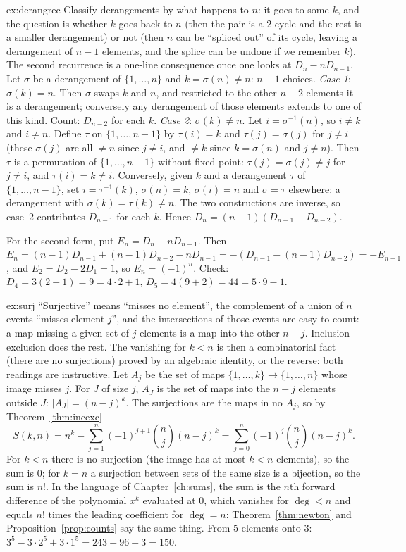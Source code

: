 \begin{solution}{ex:derangrec}
\idea Classify derangements by what happens to $n$: it goes to some $k$, and the question is whether $k$ goes back to $n$ (then the pair is a $2$-cycle and the rest is a smaller derangement) or not (then $n$ can be ``spliced out'' of its cycle, leaving a derangement of $n-1$ elements, and the splice can be undone if we remember $k$). The second recurrence is a one-line consequence once one looks at $D_n-nD_{n-1}$.
\writeup Let $\sigma$ be a derangement of $\{1,\dots,n\}$ and $k=\sigma(n)\ne n$: $n-1$ choices. \emph{Case 1}: $\sigma(k)=n$. Then $\sigma$ swaps $k$ and $n$, and restricted to the other $n-2$ elements it is a derangement; conversely any derangement of those elements extends to one of this kind. Count: $D_{n-2}$ for each $k$. \emph{Case 2}: $\sigma(k)\ne n$. Let $i=\sigma^{-1}(n)$, so $i\ne k$ and $i\ne n$. Define $\tau$ on $\{1,\dots,n-1\}$ by $\tau(i)=k$ and $\tau(j)=\sigma(j)$ for $j\ne i$ (these $\sigma(j)$ are all $\ne n$ since $j\ne i$, and $\ne k$ since $k=\sigma(n)$ and $j\ne n$). Then $\tau$ is a permutation of $\{1,\dots,n-1\}$ without fixed point: $\tau(j)=\sigma(j)\ne j$ for $j\ne i$, and $\tau(i)=k\ne i$. Conversely, given $k$ and a derangement $\tau$ of $\{1,\dots,n-1\}$, set $i=\tau^{-1}(k)$, $\sigma(n)=k$, $\sigma(i)=n$ and $\sigma=\tau$ elsewhere: a derangement with $\sigma(k)=\tau(k)\ne n$. The two constructions are inverse, so case~2 contributes $D_{n-1}$ for each $k$. Hence $D_n=(n-1)(D_{n-1}+D_{n-2})$.

For the second form, put $E_n=D_n-nD_{n-1}$. Then $E_n=(n-1)D_{n-1}+(n-1)D_{n-2}-nD_{n-1}=-(D_{n-1}-(n-1)D_{n-2})=-E_{n-1}$, and $E_2=D_2-2D_1=1$, so $E_n=(-1)^n$. Check: $D_4=3(2+1)=9=4\cdot2+1$, $D_5=4(9+2)=44=5\cdot9-1$.
\end{solution}

\begin{solution}{ex:surj}
\idea ``Surjective'' means ``misses no element'', the complement of a union of $n$ events ``misses element $j$'', and the intersections of those events are easy to count: a map missing a given set of $j$ elements is a map into the other $n-j$. Inclusion--exclusion does the rest. The vanishing for $k<n$ is then a combinatorial fact (there are no surjections) proved by an algebraic identity, or the reverse: both readings are instructive.
\writeup Let $A_j$ be the set of maps $\{1,\dots,k\}\to\{1,\dots,n\}$ whose image misses $j$. For $J$ of size $j$, $A_J$ is the set of maps into the $n-j$ elements outside $J$: $|A_J|=(n-j)^k$. The surjections are the maps in no $A_j$, so by Theorem~\ref{thm:incexc}
\[
S(k,n)=n^k-\sum_{j=1}^n(-1)^{j+1}\binom nj(n-j)^k=\sum_{j=0}^n(-1)^j\binom nj(n-j)^k .
\]
For $k<n$ there is no surjection (the image has at most $k<n$ elements), so the sum is $0$; for $k=n$ a surjection between sets of the same size is a bijection, so the sum is $n!$. In the language of Chapter~\ref{ch:sums}, the sum is the $n$th forward difference of the polynomial $x^k$ evaluated at $0$, which vanishes for $\deg<n$ and equals $n!$ times the leading coefficient for $\deg=n$: Theorem~\ref{thm:newton} and Proposition~\ref{prop:counts} say the same thing. From $5$ elements onto $3$: $3^5-3\cdot2^5+3\cdot1^5=243-96+3=150$.
\end{solution}

